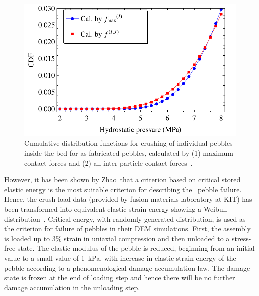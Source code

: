 \begin{figure}[!ht]
  \centering
\includegraphics[width=\singleimagewidth]{figures/Fig-4}
 \caption{Cumulative distribution functions for crushing of individual pebbles inside the bed for as-fabricated pebbles, calculated by (1) maximum contact forces and (2) all inter-particle contact forces~\cite{Gan:2010kc}.}
 \label{fig:cdf_pebbles}
\end{figure}

However, it has been shown by Zhao\etal~that a criterion based on critical stored elastic energy is the most suitable criterion for describing the \lis~pebble failure.\cite{Zhao2010,Zhao2011} Hence, the crush load data (provided by fusion materials laboratory at KIT) has been transformed into equivalent elastic strain energy showing a Weibull distribution~\cite{Zhao2010}. Critical energy, with randomly generated distribution, is used as the criterion for failure of pebbles in their DEM simulations. First, the assembly is loaded up to 3\% strain in uniaxial compression and then unloaded to a stress-free state. The elastic modulus of the pebble is reduced, beginning from an initial value to a small value of \SI{1}{\kilo\pascal}, with increase in elastic strain energy of the pebble according to a phenomenological damage accumulation law.\cite{Annabattula2012a} The damage state is frozen at the end of loading step and hence there will be no further damage accumulation in the unloading step. 

